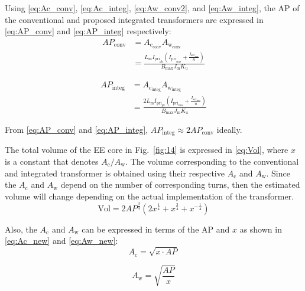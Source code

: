 \documentclass[lettersize,journal]{IEEEtran}
\begin{document}
Using \eqref{eq:Ac_conv}, \eqref{eq:Ac_integ}, \eqref{eq:Aw_conv2}, and \eqref{eq:Aw_integ}, the AP of the conventional and proposed integrated transformers are expressed in \eqref{eq:AP_conv} and \eqref{eq:AP_integ} respectively:
\begin{align}
\label{eq:AP_conv}
AP_{\mathrm{conv}} &= A_{\mathrm{c}_{\mathrm{conv}}} A_{\mathrm{w}_{\mathrm{conv}}} \nonumber \\ &=\frac{L_{\mathrm{m}} I_{\mathrm{pri}_{\mathrm{pk}}} \left( I_{\mathrm{pri}_{\mathrm{rms}}} + \frac{I_{\mathrm{sec}_{\mathrm{rms}}}}{n} \right)}{B_{\mathrm{max}} J_{\mathrm{m}} K_{\mathrm{u}}}
\end{align}

\begin{align}
\label{eq:AP_integ}
AP_{\mathrm{integ}} &= A_{\mathrm{c}_{\mathrm{integ}}} A_{\mathrm{w}_{\mathrm{integ}}} \nonumber \\ &= \frac{2 L_{\mathrm{m}} I_{\mathrm{pri}_{\mathrm{pk}}} \left( I_{\mathrm{pri}_{\mathrm{rms}}} + \frac{I_{\mathrm{sec}_{\mathrm{rms}}}}{n} \right)}{B_{\mathrm{max}} J_{\mathrm{m}} K_{\mathrm{u}}}
\end{align}

From \eqref{eq:AP_conv} and \eqref{eq:AP_integ}, $AP_{\mathrm{integ}} \approx 2 AP_{\mathrm{conv}}$ ideally.

The total volume of the EE core in Fig.~\ref{fig:14} is expressed in \eqref{eq:Vol}, where $x$ is a constant that denotes $A_{\mathrm{c}}/A_{\mathrm{w}}$. The volume corresponding to the conventional and integrated transformer is obtained using their respective $A_{\mathrm{c}}$ and $A_{\mathrm{w}}$. Since the $A_{\mathrm{c}}$ and $A_{\mathrm{w}}$ depend on the number of corresponding turns, then the estimated volume will change depending on the actual implementation of the transformer.
\begin{equation}
\label{eq:Vol}
\mathrm{Vol} = 2 AP^{\frac{3}{4}} \left(2 x^{\frac{1}{4}} + x^{\frac{3}{4}} + x^{-\frac{1}{4}}\right)
\end{equation}

Also, the $A_{\mathrm{c}}$ and $A_{\mathrm{w}}$ can be expressed in terms of the AP and $x$ as shown in \eqref{eq:Ac_new} and \eqref{eq:Aw_new}:
\begin{equation}
\label{eq:Ac_new}
A_{\mathrm{c}} = \sqrt{x \cdot AP}
\end{equation}

\begin{equation}
\label{eq:Aw_new}
A_{\mathrm{w}} = \sqrt{\frac{AP}{x}}
\end{equation}
\end{document}
